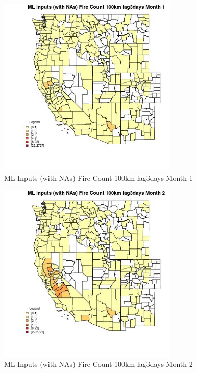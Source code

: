 \begin{figure} 
\centering  
\includegraphics[width=0.77\textwidth]{Code_Outputs/Report_ML_input_PM25_Step4_part_f_de_duplicated_aveswNAs_CountyFire_Count_100km_lag3daysmedianMonth1.jpg} 
\caption{\label{fig:Report_ML_input_PM25_Step4_part_f_de_duplicated_aveswNAsCountyFire_Count_100km_lag3daysmedianMonth1}ML Inputs (with NAs) Fire Count 100km lag3days Month 1} 
\end{figure} 
 

\begin{figure} 
\centering  
\includegraphics[width=0.77\textwidth]{Code_Outputs/Report_ML_input_PM25_Step4_part_f_de_duplicated_aveswNAs_CountyFire_Count_100km_lag3daysmedianMonth2.jpg} 
\caption{\label{fig:Report_ML_input_PM25_Step4_part_f_de_duplicated_aveswNAsCountyFire_Count_100km_lag3daysmedianMonth2}ML Inputs (with NAs) Fire Count 100km lag3days Month 2} 
\end{figure} 
 

